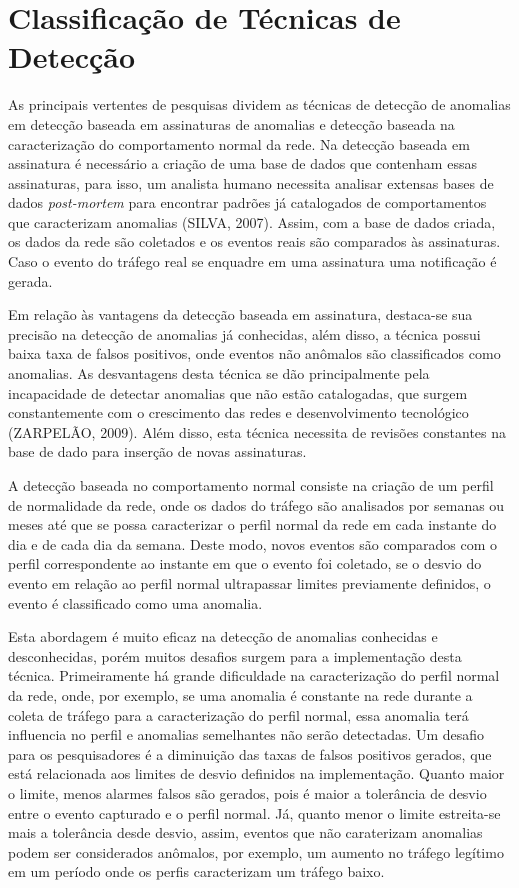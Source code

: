 \documentclass[12pt,openright,oneside,a4paper,english,spanish,brazil]{unifil}
\begin{document}
  \section{Classificação de Técnicas de Detecção}


\indent As principais vertentes de pesquisas dividem as técnicas de detecção de anomalias em detecção baseada em assinaturas de anomalias e detecção baseada na caracterização do comportamento normal da rede. Na detecção baseada em assinatura é necessário a criação de uma base de dados que contenham essas assinaturas, para isso, um analista humano necessita analisar extensas bases de dados \textit{post-mortem} para encontrar padrões já catalogados de comportamentos que caracterizam anomalias (SILVA, 2007). Assim, com a base de dados criada, os dados da rede são coletados e os eventos reais são comparados às assinaturas. Caso o evento do tráfego real se enquadre em uma assinatura uma notificação é gerada.

\indent Em relação às vantagens da detecção baseada em assinatura, destaca-se sua precisão na detecção de anomalias já conhecidas, além disso, a técnica possui baixa taxa de falsos positivos, onde eventos não anômalos são classificados como anomalias. As desvantagens desta técnica se dão principalmente pela incapacidade de detectar anomalias que não estão catalogadas, que surgem constantemente com o crescimento das redes e desenvolvimento tecnológico (ZARPELÃO, 2009). Além disso, esta técnica necessita de revisões constantes na base de dado para inserção de novas assinaturas.

\indent A detecção baseada no comportamento normal consiste na criação de um perfil de normalidade da rede, onde os dados do tráfego são analisados por semanas ou meses até que se possa caracterizar o perfil normal da rede em cada instante do dia e de cada dia da semana. Deste modo, novos eventos são comparados com o perfil correspondente ao instante em que o evento foi coletado, se o desvio do evento em relação ao perfil normal ultrapassar limites previamente definidos, o evento é classificado como uma anomalia.

\indent Esta abordagem é muito eficaz na detecção de anomalias conhecidas e desconhecidas, porém muitos desafios surgem para a implementação desta técnica. Primeiramente há grande dificuldade na caracterização do perfil normal da rede, onde, por exemplo, se uma anomalia é constante na rede durante a coleta de tráfego para a caracterização do perfil normal, essa anomalia terá influencia no perfil e anomalias semelhantes não serão detectadas. Um desafio para os pesquisadores é a diminuição das taxas de falsos positivos gerados, que está relacionada aos limites de desvio definidos na implementação. Quanto maior o limite, menos alarmes falsos são gerados, pois é maior a tolerância de desvio entre o evento capturado e o perfil normal. Já, quanto menor o limite estreita-se mais a tolerância desde desvio, assim, eventos que não caraterizam anomalias podem ser considerados anômalos, por exemplo, um aumento no tráfego legítimo em um período onde os perfis caracterizam um tráfego baixo.
\end{document}
